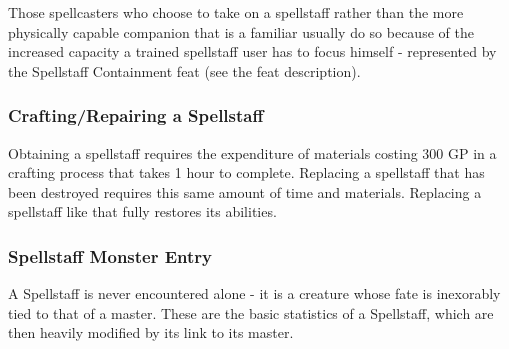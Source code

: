 Those spellcasters who choose to take on a spellstaff rather than the more physically capable companion that is a familiar 
usually do so because of the increased capacity a trained spellstaff user has to focus himself
- represented by the Spellstaff Containment feat (see the  feat description).
\subsubsection{Crafting/Repairing a Spellstaff}
\label{sec:CraftingASpellstaff}
Obtaining a spellstaff requires the expenditure of materials costing 300 GP in a crafting process that takes 1 hour to complete.
Replacing a spellstaff that has been destroyed requires this same amount of time and materials. 
Replacing a spellstaff like that fully restores its abilities.
\subsubsection{Spellstaff Monster Entry}
\label{sec:SpellStaffMonsterEntry}
A Spellstaff is never encountered alone - it is a creature whose fate is inexorably tied to that of a master.
These are the basic statistics of a Spellstaff, which are then heavily modified by its link to its master.
\begin{table*}
\caption{Spellstaff}
\end{table*}

